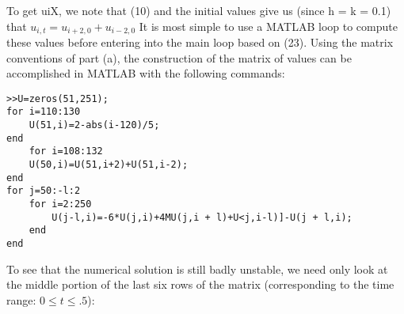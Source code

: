 \documentclass[../main.tex]{subfiles}
\begin{document}
To get uiX, we note that (10) and the initial values give us (since h = k = 0.1) that $u_{i,t}=u_{i+2,0}+u_{i-2,0}$ It is most simple to use a MATLAB loop to compute these values before entering into the main loop based on (23). Using the matrix conventions of part (a), the construction of the matrix of values can be accomplished in MATLAB with the following commands:
\begin{lstlisting}[numbers=none,frame=none]
>>U=zeros(51,251); 
for i=110:130 
	U(51,i)=2-abs(i-120)/5; 
end 
	for i=108:132 
	U(50,i)=U(51,i+2)+U(51,i-2); 
end 
for j=50:-l:2 
	for i=2:250 
		U(j-l,i)=-6*U(j,i)+4MU(j,i + l)+U<j,i-l)]-U(j + l,i); 
	end 
end  
\end{lstlisting}
To see that the numerical solution is still badly unstable, we need only look at the 
middle portion of the last six rows of the matrix (corresponding to the time range: 
$0 \leqslant t \leqslant .5$):
\end{document}
